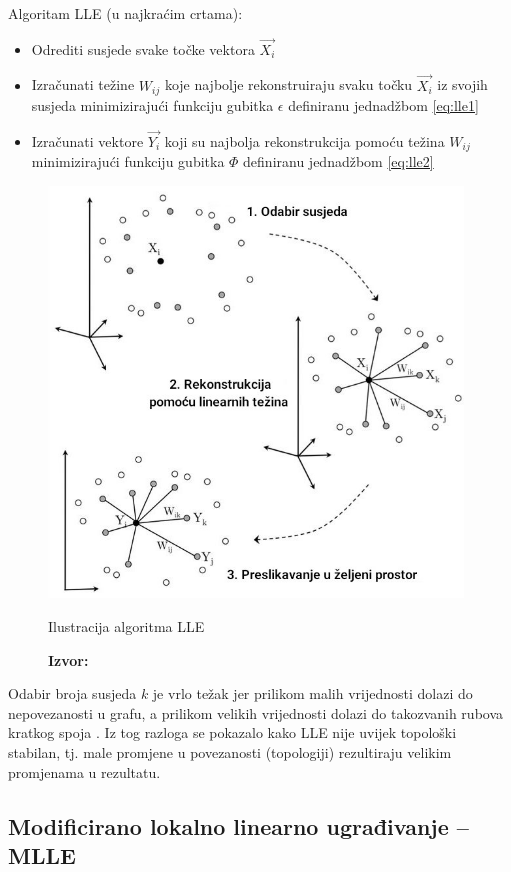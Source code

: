\documentclass[times, utf8, diplomski]{fer}
\newcommand*{\captionsource}[2]{            %
    \RawFloats
    \caption{#1}
    \caption*{\textbf{Izvor:} #2}
}
\begin{document}
Algoritam LLE (u najkraćim crtama):
\begin{itemize}
    \item Odrediti susjede svake točke vektora $\vec{X_i}$
    \item Izračunati težine $W_{ij}$ koje najbolje rekonstruiraju svaku točku $\vec{X_i}$ iz svojih susjeda minimizirajući funkciju gubitka $\epsilon$ definiranu jednadžbom \ref{eq:lle1}
    \item Izračunati vektore $\vec{Y_i}$ koji su najbolja rekonstrukcija pomoću težina $W_{ij}$ minimizirajući funkciju gubitka $\Phi$ definiranu jednadžbom \ref{eq:lle2}
\end{itemize}

\begin{figure}[htb]
    \centering
    \includegraphics[width=11cm]{resources/images/reduction/lle_steps.jpg}
    \captionsource{Ilustracija algoritma LLE}{\cite{saul2003think}}
    \label{fig:lle_steps}
\end{figure}

Odabir broja susjeda $k$ je vrlo težak jer prilikom malih vrijednosti dolazi do nepovezanosti u grafu, a prilikom velikih vrijednosti dolazi do takozvanih rubova kratkog spoja \citep{balasubramanian2002isomap}.
Iz tog razloga se pokazalo kako LLE nije uvijek topološki stabilan, tj. male promjene u povezanosti (topologiji) rezultiraju velikim promjenama u rezultatu.
\newpage

\subsection{Modificirano lokalno linearno ugrađivanje -- MLLE}
\end{document}

